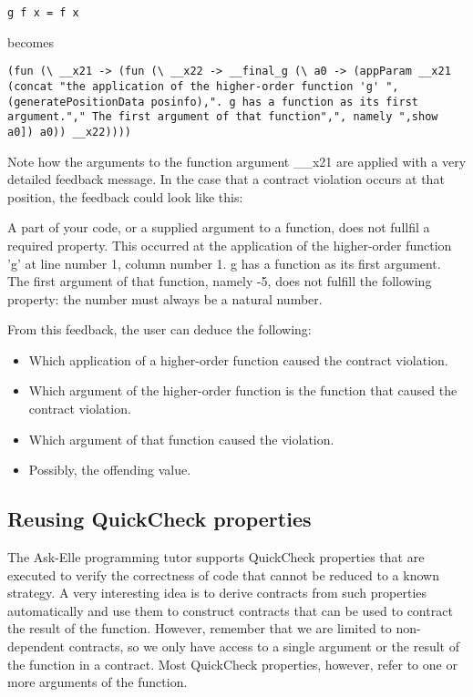 \documentclass[10pt]{report}
\begin{document}
\begin{lstlisting}
g f x = f x
\end{lstlisting}

becomes

\begin{lstlisting}
(fun (\ __x21 -> (fun (\ __x22 -> __final_g (\ a0 -> (appParam __x21 (concat "the application of the higher-order function 'g' ",(generatePositionData posinfo),". g has a function as its first argument."," The first argument of that function",", namely ",show a0]) a0)) __x22))))
\end{lstlisting}

Note how the arguments to the function argument \_\_x21 are applied with a very detailed feedback message.
In the case that a contract violation occurs at that position, the feedback could look like this:

A part of your code, or a supplied argument to a function, does not fullfil a required property. This occurred at the application of the higher-order function 'g' at line number 1, column number 1. g has a function as its first argument. The first argument of that function, namely -5, does not fulfill the following property: the number must always be a natural number.

From this feedback, the user can deduce the following:
\begin{itemize}
\item Which application of a higher-order function caused the contract violation.
\item Which argument of the higher-order function is the function that caused the contract violation.
\item Which argument of that function caused the violation.
\item Possibly, the offending value.
\end{itemize}

\subsection{Reusing QuickCheck properties}

The Ask-Elle programming tutor supports QuickCheck properties that are executed to verify the correctness of code that cannot be reduced to a known strategy.
A very interesting idea is to derive contracts from such properties automatically and use them to construct contracts that can be used to contract the result of the function.
However, remember that we are limited to non-dependent contracts, so we only have access to a single argument or the result of the function in a contract.
Most QuickCheck properties, however, refer to one or more arguments of the function.
\end{document}
